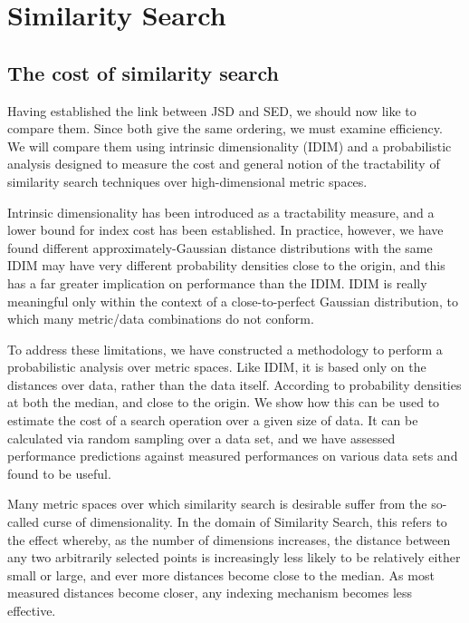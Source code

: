 \chapter{Similarity Search}\label{ch:cost}
\section{The cost of similarity search}
Having established the link between JSD and SED, we should now like to compare them.  Since both give the same ordering, we must examine efficiency.  We will compare them using intrinsic dimensionality (IDIM) and a probabilistic analysis designed to measure the cost and general notion of the tractability of similarity search techniques over high-dimensional metric spaces.  

Intrinsic dimensionality has been introduced as a tractability measure\cite{}, and a lower bound for index cost has been established. In practice, however, we have found different approximately-Gaussian distance distributions with the same IDIM may have very different probability densities close to the origin, and this has a far greater implication on performance than the IDIM. IDIM is really meaningful only within the context of a close-to-perfect Gaussian distribution, to which many metric/data combinations do not conform.

To address these limitations, we have constructed a methodology to perform a probabilistic analysis over metric spaces. Like IDIM, it is based
only on the distances over data, rather than the data itself. According to probability densities at both the median, and close to the origin. We show how this can be used to estimate the cost of a search operation over a given size of data.  It can be calculated via random sampling over a data set, and we have assessed performance predictions against measured performances on various data sets and found to be useful.

Many metric spaces over which similarity search is desirable suffer from the so-called curse of dimensionality. In the domain of Similarity Search, this refers to the effect whereby, as the number of dimensions increases, the distance between any two arbitrarily selected points is increasingly less likely to be relatively either small or large, and ever more distances become close to the median. As most measured distances become closer, any indexing mechanism becomes less effective.

